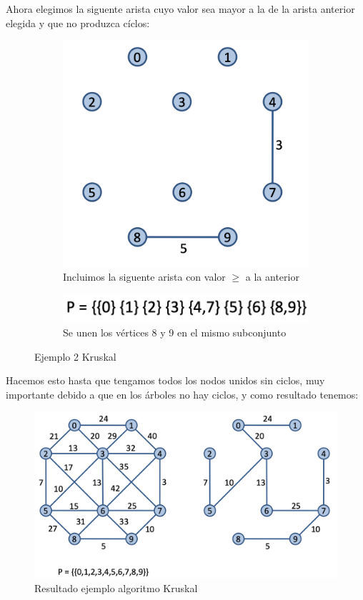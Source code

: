 Ahora elegimos la siguente arista cuyo valor sea mayor a la de la arista anterior elegida y que no produzca cíclos:
\begin{figure}[h]
  \begin{minipage}{0.4\textwidth}
    \centering
    \begin{subfigure}{\textwidth}
      \centering
      \includegraphics[width=.65\textwidth]{assets/kru5.png}
      \caption{Incluimos la siguente arista con valor \(\geq\) a la anterior}
    \end{subfigure}
  \end{minipage}
  \hfill
  \begin{minipage}{0.5\textwidth}
    \centering
    \begin{subfigure}{\textwidth}
      \centering
      \includegraphics[width=\textwidth]{assets/kru6.png}
      \caption{Se unen los vértices 8 y 9 en el mismo subconjunto}
    \end{subfigure}
  \end{minipage}
  \caption{Ejemplo 2 Kruskal}
\end{figure}

Hacemos esto hasta que tengamos todos los nodos unidos sin ciclos, muy importante debido a que en los árboles no hay ciclos, y como resultado tenemos:

\begin{figure}[h]
  \begin{center}
    \includegraphics[width=.7\textwidth]{assets/kru4.png}
  \end{center}
  \caption{Resultado ejemplo algoritmo Kruskal}
\end{figure}

